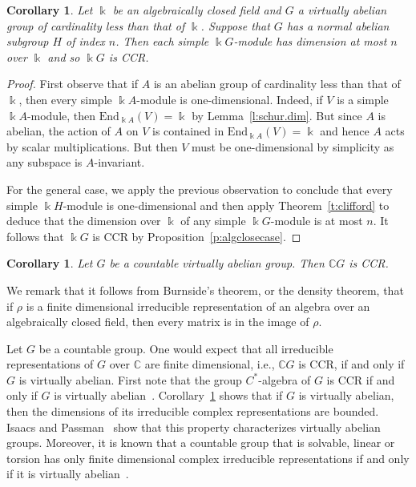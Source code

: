 \documentclass[11pt,reqno]{amsart}
\theoremstyle{plain}
\newtheorem{cor}[thm]{Corollary}
{\theoremstyle{definition}
\newtheorem{dfn}[thm]{Definition}}
{\theoremstyle{remark}
\newtheorem{ex}[thm]{Example}}
{\theoremstyle{remark}
\newtheorem*{ex*}{Example}}
{\theoremstyle{definition}
\newtheorem{note}[thm]{Note}}
{\theoremstyle{remark}
\newtheorem{remark}[thm]{Remark}}
\numberwithin{equation}{section}
\begin{document}
\begin{cor}\label{c:CCR.group}
Let $\Bbbk$ be an algebraically closed field and $G$ a virtually abelian group of cardinality less than that of $\Bbbk$.  Suppose that $G$ has a normal abelian subgroup $H$ of index $n$.  Then each simple $\Bbbk G$-module has dimension at most $n$ over $\Bbbk$ and so $\Bbbk G$ is CCR.
\end{cor}
\begin{proof}
First observe that if $A$ is an abelian group of cardinality less than that of $\Bbbk$, then every simple $\Bbbk A$-module is one-dimensional.  Indeed, if $V$ is a simple $\Bbbk A$-module, then $\mathrm{End}_{\Bbbk A}(V)=\Bbbk$ by Lemma~\ref{l:schur.dim}.  But since $A$ is abelian, the action of $A$ on $V$ is contained in $\mathrm{End}_{\Bbbk A}(V)=\Bbbk$  and hence $A$ acts by scalar multiplications.  But then $V$ must be one-dimensional by simplicity as any subspace is $A$-invariant.

For the general case, we apply the previous observation to conclude that every simple $\Bbbk H$-module is one-dimensional and then apply Theorem~\ref{t:clifford} to deduce that the dimension over $\Bbbk$ of any simple $\Bbbk G$-module is at most $n$.  It follows that $\Bbbk G$ is CCR by Proposition~\ref{p:algclosecase}.
\end{proof}

\begin{cor}\label{c:CG.complex}
Let $G$ be a countable virtually abelian group.  Then $\mathbb CG$ is CCR.
\end{cor}

We remark that it follows from Burnside's theorem, or the density theorem, that if $\rho$ is a finite dimensional irreducible representation of an algebra over an algebraically closed field, then every matrix is in the image of $\rho$.

Let $G$ be a countable group.  One would expect that all irreducible representations of $G$ over $\mathbb C$ are finite dimensional, i.e., $\mathbb CG$ is CCR, if and only if $G$ is virtually abelian.    First note that the group $C^*$-algebra of $G$ is CCR if and only if $G$ is virtually abelian~\cite{Th64}.  Corollary~\ref{c:CCR.group} shows that if $G$ is virtually abelian, then the dimensions of its irreducible complex representations are bounded.  Isaacs and Passman~\cite{IP64} show that this property characterizes virtually abelian groups. Moreover, it is known that a countable group that is solvable, linear or torsion has only finite dimensional complex irreducible representations if and only if it is virtually abelian~\cite{PT00,Sn06}.
\end{document}
